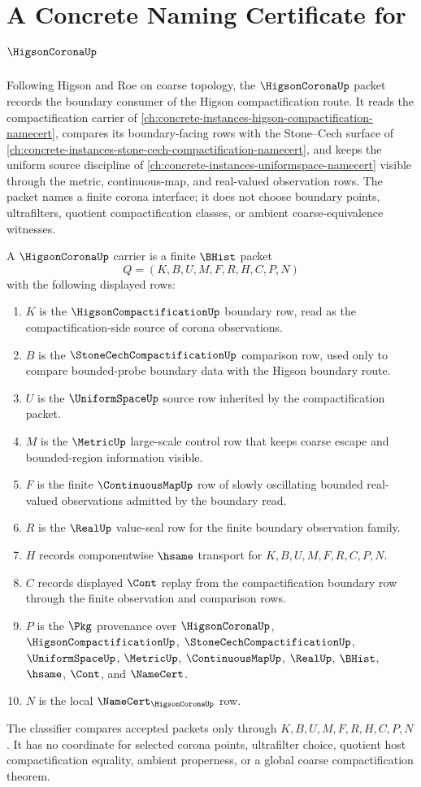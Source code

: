 \chapter{A Concrete Naming Certificate for $\HigsonCoronaUp$}
\label{ch:concrete-instances-higson-corona-namecert}

Following Higson and Roe on coarse topology, the $\HigsonCoronaUp$ packet records the boundary consumer of the Higson compactification route. It reads the compactification carrier of \autoref{ch:concrete-instances-higson-compactification-namecert}, compares its boundary-facing rows with the Stone--Cech surface of \autoref{ch:concrete-instances-stone-cech-compactification-namecert}, and keeps the uniform source discipline of \autoref{ch:concrete-instances-uniformspace-namecert} visible through the metric, continuous-map, and real-valued observation rows. The packet names a finite corona interface; it does not choose boundary points, ultrafilters, quotient compactification classes, or ambient coarse-equivalence witnesses.

\begin{definition}
\label{def:higson-corona-carrier}
A $\HigsonCoronaUp$ carrier is a finite $\BHist$ packet
$$
Q=(K,B,U,M,F,R,H,C,P,N)
$$
with the following displayed rows:
\begin{enumerate}
\item $K$ is the $\HigsonCompactificationUp$ boundary row, read as the compactification-side source of corona observations.
\item $B$ is the $\StoneCechCompactificationUp$ comparison row, used only to compare bounded-probe boundary data with the Higson boundary route.
\item $U$ is the $\UniformSpaceUp$ source row inherited by the compactification packet.
\item $M$ is the $\MetricUp$ large-scale control row that keeps coarse escape and bounded-region information visible.
\item $F$ is the finite $\ContinuousMapUp$ row of slowly oscillating bounded real-valued observations admitted by the boundary read.
\item $R$ is the $\RealUp$ value-seal row for the finite boundary observation family.
\item $H$ records componentwise $\hsame$ transport for $K,B,U,M,F,R,C,P,N$.
\item $C$ records displayed $\Cont$ replay from the compactification boundary row through the finite observation and comparison rows.
\item $P$ is the $\Pkg$ provenance over $\HigsonCoronaUp$, $\HigsonCompactificationUp$, $\StoneCechCompactificationUp$, $\UniformSpaceUp$, $\MetricUp$, $\ContinuousMapUp$, $\RealUp$, $\BHist$, $\hsame$, $\Cont$, and $\NameCert$.
\item $N$ is the local $\NameCert_{\HigsonCoronaUp}$ row.
\end{enumerate}
The classifier compares accepted packets only through $K,B,U,M,F,R,H,C,P,N$. It has no coordinate for selected corona points, ultrafilter choice, quotient host compactification equality, ambient properness, or a global coarse compactification theorem.
\end{definition}

